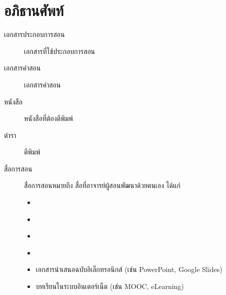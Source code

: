 \documentclass[a4paper,12pt,english]{sphinxmanual}
\begin{document}
\chapter{อภิธานศัพท์}
\label{\detokenize{glossary:id1}}\label{\detokenize{glossary::doc}}\begin{description}
\item[{เอกสารประกอบการสอน\label{\detokenize{glossary:term-0}}}] \leavevmode
เอกสารที่ใช้ประกอบการสอน

\item[{เอกสารคำสอน\label{\detokenize{glossary:term-1}}}] \leavevmode
เอกสารคำสอน

\item[{หนังสือ\label{\detokenize{glossary:term-2}}}] \leavevmode
หนังสือที่ต้องตีพิมพ์

\item[{ตำรา\label{\detokenize{glossary:term-3}}}] \leavevmode
ตีพิมพ์

\item[{สื่อการสอน\label{\detokenize{glossary:term-4}}}] \leavevmode
สื่อการสอนหมายถึง สื่อที่อาจารย์ผู้สอนพัฒนาด้วยตนเอง ได้แก่
\begin{itemize}
\item {} 
{\hyperref[\detokenize{glossary:term-0}]{}}

\item {} 
{\hyperref[\detokenize{glossary:term-1}]{}}

\item {} 
{\hyperref[\detokenize{glossary:term-2}]{}}

\item {} 
{\hyperref[\detokenize{glossary:term-3}]{}}

\item {} 
เอกสารนำเสนอฉบับอิเล็กทรอนิกส์ (เช่น PowerPoint, Google Slides)

\item {} 
บทเรียนในระบบอินเตอร์เน็ต (เช่น MOOC, e\sphinxhyphen{}Learning)

\end{itemize}


\end{description}
\end{document}

